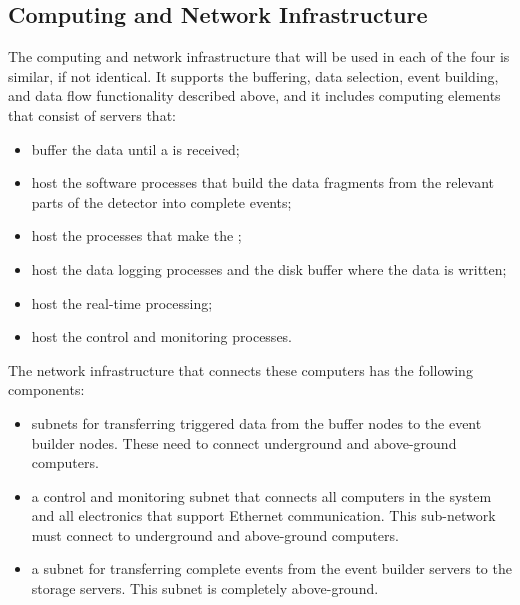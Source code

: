 
\subsection{Computing and Network Infrastructure}
\label{sec:fd-daq-infra}


The computing and network infrastructure that will be used in each
of the four  is similar, if not identical.
It supports the buffering, data selection, event
building, and data flow functionality described
above, and it includes computing elements that consist of servers that:

\begin{itemize}
\item buffer the data until a 
  is received;
\item host the software processes that
  build the data fragments from the relevant
  parts of the detector into complete events;
\item host the processes that make the
  ;
\item host the data logging processes and
  the disk buffer where the data is written;
\item host the real-time  processing;
\item host the control and monitoring processes.
\end{itemize}

The network infrastructure that connects these computers has the following components:

\begin{itemize}
\item subnets for transferring triggered data from the buffer
  nodes to the event builder nodes.  These need to
  connect underground and above-ground computers.
\item a control and monitoring subnet that connects all
  computers in the  system and all 
  electronics that support Ethernet communication.  This
  sub-network must connect to underground and
  above-ground computers.
\item a subnet for transferring complete events from the
  event builder servers to the storage servers.  This subnet
  is completely above-ground.
\end{itemize}
